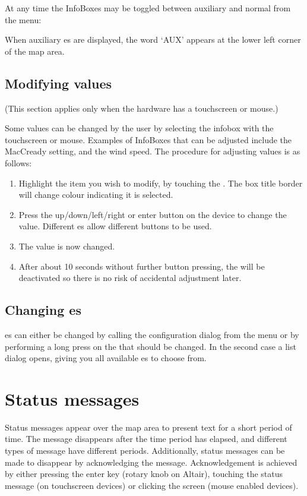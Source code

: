 \documentclass[a4paper,12pt]{refrep}
\begin{document}
At any time the InfoBoxes may be toggled between auxiliary and normal from
the menu:
\begin{quote}
\blink{}
\end{quote}

When auxiliary {\InfoBox}es are displayed, the word `AUX' appears at the
lower left corner of the map area.

\subsection*{Modifying {\InfoBox} values}
(This section applies only when the hardware has
a touchscreen or mouse.)

Some {\InfoBox} values can be changed by the user by selecting the
infobox with the touchscreen or mouse.  Examples of InfoBoxes that can
be adjusted include the MacCready setting, and the wind speed.
The procedure for adjusting {\InfoBox} values is as follows:
\begin{enumerate}
\item Highlight the item you wish to modify, by touching the {\InfoBox}. The box
title border will change colour indicating it is selected.
\item Press the up/down/left/right or enter button on the device
to change the value.  Different {\InfoBox}es allow different buttons to
be used.
\item The value is now changed.
\item After about 10 seconds without further button pressing, the {\InfoBox}
will be deactivated so there is no risk of accidental adjustment later.
\end{enumerate}

\subsection*{Changing {\InfoBox}es}
{\InfoBox}es can either be changed by calling the configuration dialog from the
menu \blink{} or by performing a long press on
the {\InfoBox} that should be changed. In the second case a list dialog opens,
giving you all available {\InfoBox}es to choose from.

\section{Status messages}
Status messages appear over the map area to present text for a short period of
time.  The message disappears after the time period has elapsed, and different
types of message have different periods. Additionally, status messages can be
made to disappear by acknowledging the message.  Acknowledgement is achieved by
either pressing the enter key (rotary knob on Altair), touching the status
message (on touchscreen devices) or clicking the screen (mouse enabled devices).
\end{document}
